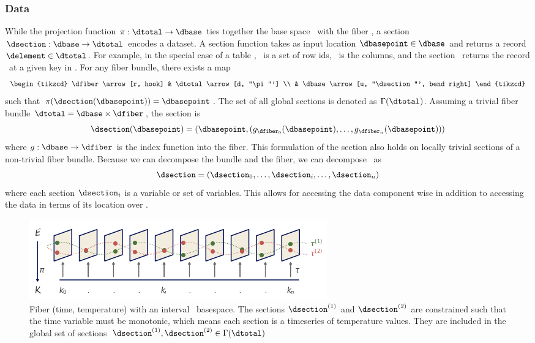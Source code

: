 \documentclass[../main.tex]{subfiles}
\begin{document}
\subsubsection{Data \dsection}
\label{sec:data_section}
While the projection function $\pi:\dtotal \rightarrow\dbase$ ties together the base space \dbase\ with the fiber \dfiber, a section $\dsection: \dbase\rightarrow \dtotal$ encodes a dataset. A section function takes as input location $\dbasepoint \in \dbase$ and returns a record $\delement \in \dtotal$. For example, in the special case of a table \cite{spivakSIMPLICIALDATABASES}, \dbase\ is a set of row ids, \dfiber\ is the columns, and the section \dsection\ returns the record \delement\ at a given key in \dbase. For any fiber bundle, there exists a map
\begin{equation}
    \begin{tikzcd}
        \dfiber \arrow[r, hook] & \dtotal \arrow[d, "\pi"'] \\
                          & \dbase \arrow[u, "\dsection"', bend right]
    \end{tikzcd}
\end{equation}
 such that $\pi(\dsection(\dbasepoint)) = \dbasepoint$. The set of all global sections is denoted as $\Gamma(\dtotal)$. Assuming a trivial fiber bundle $\dtotal = \dbase \times \dfiber$, the section is 
\begin{equation}
    \label{eq:section_return}
    \dsection(\dbasepoint) = (\dbasepoint, (g_{\dfiber_{0}}(\dbasepoint), \ldots, g_{\dfiber_{n}}(\dbasepoint)))
\end{equation}
where $g: \dbase \rightarrow \dfiber$ is the index function into the fiber. This formulation of the section also holds on locally trivial sections of a non-trivial fiber bundle. Because we can decompose the bundle and the fiber, we can decompose \dsection\ as 
\begin{equation}
\label{eq:data_section_decompose}
\dsection= (\dsection_0,\ldots, \dsection_i, \dots, \dsection_n) 
\end{equation}
where each section $\dsection_i$ is a variable or set of variables. This allows for accessing the data component wise in addition to accessing the data in terms of its location over \dbase.

\begin{figure}[H]
    \includegraphics[width=1\linewidth]{figures/math/fiberbundle.png}
    \caption{ Fiber (time, temperature) with an interval \dbase\ basespace. The sections $\dsection^{(1)}$ and $\dsection^{(2)}$ are constrained such that the time variable must be monotonic, which means each section is a timeseries of temperature values. They are included in the global set of sections  $\dsection^{(1)}, \dsection^{(2)} \in \Gamma(\dtotal)$}
    \label{fig:data_sections}
\end{figure}
\end{document}
